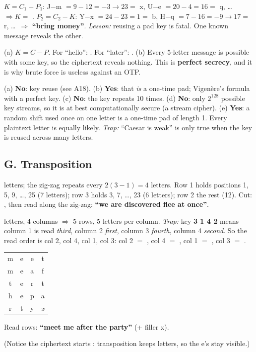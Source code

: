 \ans $K = C_1 - P_1$: J$-$m $= 9-12 = -3 \to 23 = $ x, U$-$e $= 20-4 = 16 = $ q, \dots\ $\Rightarrow K = $ \textbf{}.
$P_2 = C_2 - K$: Y$-$x $= 24-23 = 1 = $ b, H$-$q $= 7-16 = -9 \to 17 = $ r, \dots\ $\Rightarrow$ \textbf{``bring money''}.
\emph{Lesson:} reusing a pad key is fatal. One known message reveals the other.

\ans (a) $K = C - P$. For ``hello'': \textbf{}. For ``later'': \textbf{}.
(b) Every 5-letter message is possible with some key, so the ciphertext reveals nothing. This is \textbf{perfect secrecy}, and it is why brute force is useless against an OTP.

\ans (a) \textbf{No}: key reuse (see A18).
(b) \textbf{Yes}: that \emph{is} a one-time pad; Vigen\`ere's formula with a perfect key.
(c) \textbf{No}: the key repeats 10 times.
(d) \textbf{No}: only $2^{128}$ possible key streams, so it is at best computationally secure (a stream cipher).
(e) \textbf{Yes}: a random shift used once on one letter is a one-time pad of length 1. Every plaintext letter is equally likely. \emph{Trap:} ``Caesar is weak'' is only true when the key is reused across many letters.

\subsection*{G. Transposition}

 letters; the zig-zag repeats every $2(3-1) = 4$ letters. Row 1 holds positions 1, 5, 9, \dots, 25 (7 letters); row 3 holds 3, 7, \dots, 23 (6 letters); row 2 the rest (12).
Cut: , then read along the zig-zag: \textbf{``we are discovered flee at once''}.

 letters, 4 columns $\Rightarrow$ 5 rows, 5 letters per column.
\emph{Trap:} key \textbf{3 1 4 2} means column 1 is read \emph{third}, column 2 \emph{first}, column 3 \emph{fourth}, column 4 \emph{second}. So the read order is col 2, col 4, col 1, col 3:
col 2 $=$ , col 4 $=$ , col 1 $=$ , col 3 $=$ .
\begin{center}\small
\begin{tabular}{|cccc|}
\hline m&e&e&t\\ m&e&a&f\\ t&e&r&t\\ h&e&p&a\\ r&t&y&\textit{x}\\ \hline
\end{tabular}
\quad Read rows: \textbf{``meet me after the party''} (+ filler x).
\end{center}
(Notice the ciphertext starts : transposition keeps letters, so the e's stay visible.)

